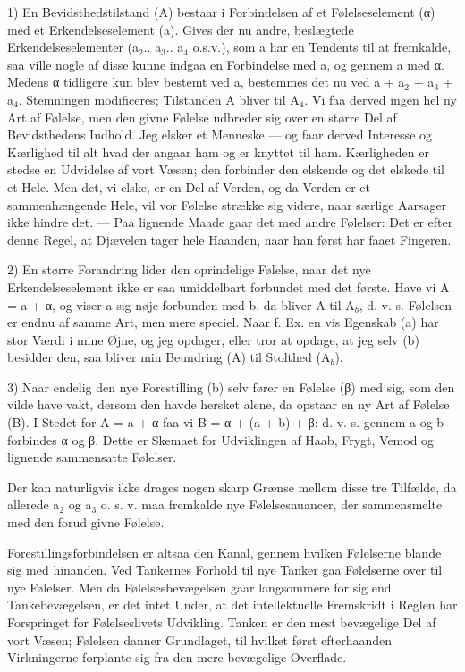 \documentclass[12pt,a4paper,openany]{book}
\newcommand{\opage}[1]{\marginnote{\footnotesize\textit{[#1]}}}
\begin{document}
1) En Bevidsthedstilstand (A) bestaar i Forbindelsen af et
Følelseselement (α) med et Erkendelseselement (a). Gives der nu andre,
beslægtede Erkendelseselementer (a$_{2}$.. a$_{3}$.. a$_{4}$ o.s.v.),
som a har en Tendents til at fremkalde, saa ville nogle af disse kunne
indgaa en Forbindelse med a, og gennem a med α. Medens α tidligere kun
blev bestemt ved a, bestemmes det nu ved a + a$_{2}$ + a$_{3}$ +
a$_{4}$. Stemningen modificeres; Tilstanden A bliver til A$_{4}$. Vi faa
derved ingen hel ny Art af Følelse, men den givne Følelse udbreder sig
over en større Del af Bevidsthedens Indhold. Jeg elsker et Menneske ---
og faar derved Interesse og Kærlighed til alt hvad der angaar ham og er
knyttet til ham. Kærligheden er stedse en Udvidelse af vort Væsen; den
forbinder den elskende og det elskede til et Hele. Men det, vi elske, er
en Del af Verden, og da Verden er et sammenhængende Hele, vil vor
Følelse strække sig videre, naar særlige Aarsager ikke hindre det. ---
Paa lignende Maade gaar det med andre Følelser: Det er efter denne
Regel, at Djævelen tager hele Haanden, naar han først har faaet
Fingeren.


\opage{290}2) En større Forandring lider den oprindelige Følelse, naar
det nye Erkendelseselement ikke er saa umiddelbart forbundet med det
første. Have vi A = a + α, og viser a sig nøje forbunden med b, da
bliver A til A$_{b}$, d. v. s. Følelsen er endnu af samme Art, men mere
speciel. Naar f. Ex. en vis Egenskab (a) har stor Værdi i mine Øjne, og
jeg opdager, eller tror at opdage, at jeg selv (b) besidder den, saa
bliver min Beundring (A) til Stolthed (A$_{b}$).

3) Naar endelig den nye Forestilling (b) selv fører en Følelse (β) med
sig, som den vilde have vakt, dersom den havde hersket alene, da opstaar
en ny Art af Følelse (B). I Stedet for A = a + α faa vi B = α + (a + b)
+ β: d. v. s. gennem a og b forbindes α og β. Dette er Skemaet for
Udviklingen af Haab, Frygt, Vemod og lignende sammensatte Følelser.

Der kan naturligvis ikke drages nogen skarp Grænse mellem disse tre
Tilfælde, da allerede a$_{2}$ og a$_{3}$ o. s. v. maa fremkalde nye
Følelsesnuancer, der sammensmelte med den forud givne Følelse.

Forestillingsforbindelsen er altsaa den Kanal, gennem hvilken Følelserne
blande sig med hinanden. Ved Tankernes Forhold til nye Tanker gaa
Følelserne over til nye Følelser. Men da Følelsesbevægelsen gaar
langsommere for sig end Tankebevægelsen, er det intet Under, at det
intellektuelle Fremskridt i Reglen har Forspringet for Følelseslivets
Udvikling. Tanken er den mest bevægelige Del af vort Væsen; Følelsen
danner Grundlaget, til hvilket først efterhaanden Virkningerne forplante
sig fra den mere bevægelige Overflade.
\end{document}
